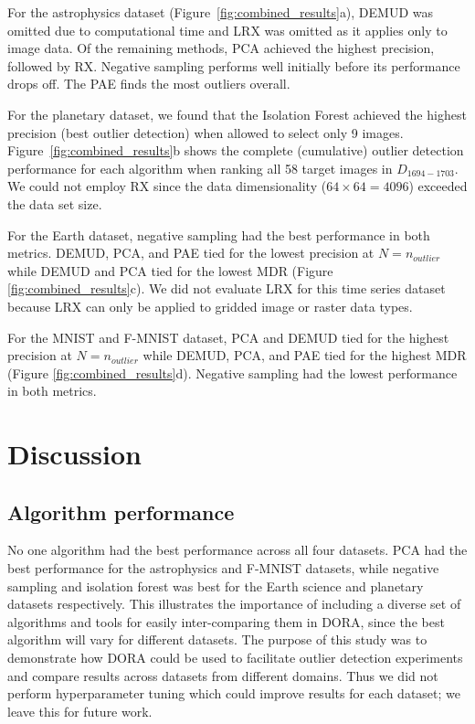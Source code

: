 \documentclass[utf8]{frontiersFPHY} %
\begin{document}
For the astrophysics dataset (Figure~\ref{fig:combined_results}a), 
DEMUD was omitted due to computational time 
and LRX was omitted as it applies only to image data.  
Of the remaining methods, 
PCA achieved the highest precision, followed by RX.  Negative sampling 
performs well initially before its performance drops off.  
The PAE finds the most outliers overall. 

For the planetary dataset, we found that
the Isolation Forest achieved the highest precision (best outlier
detection) when allowed to select only \num{9} images.
Figure~\ref{fig:combined_results}b shows the complete (cumulative)
outlier detection performance for each algorithm when ranking
all \num{58} target images in $D_{1694-1703}$. We could not
employ RX since the data dimensionality ($64 \times 64 =
4096$) exceeded the data set size. 

For the Earth dataset, negative sampling had the best performance
in both metrics. DEMUD, PCA, and PAE tied for the lowest precision at 
$N=n_{outlier}$ while DEMUD and PCA tied for the lowest
MDR (Figure \ref{fig:combined_results}c). We did not evaluate LRX for this time 
series dataset because LRX can only be applied to gridded image or raster 
data types.

For the MNIST and F-MNIST dataset, PCA and DEMUD tied for the highest
precision at $N=n_{outlier}$
while DEMUD, PCA, and PAE tied for the highest MDR 
(Figure \ref{fig:combined_results}d). 
Negative sampling had the 
lowest performance in both metrics. 


\section{Discussion}

\subsection{Algorithm performance} 
No one algorithm  
had the best performance across all four datasets. PCA had
the best performance for the astrophysics and F-MNIST datasets, 
while negative sampling and isolation forest was best for
the Earth science and planetary datasets respectively. This illustrates
the importance of including a diverse set of algorithms and tools for
easily inter-comparing them in DORA, since the best
algorithm will vary for different datasets. The purpose of this study
was to demonstrate how DORA could be used to facilitate 
outlier detection experiments and compare results across datasets from 
different domains. Thus we did not perform hyperparameter tuning which
could improve results for each dataset; we leave this for future work.
\end{document}
